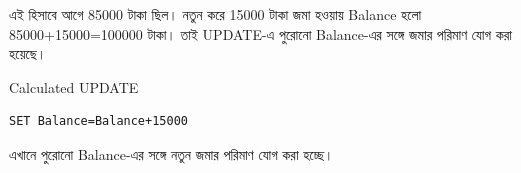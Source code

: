 এই হিসাবে আগে 85000 টাকা ছিল। নতুন করে 15000 টাকা জমা হওয়ায় Balance হলো 85000+15000=100000 টাকা। তাই UPDATE-এ পুরোনো Balance-এর সঙ্গে জমার পরিমাণ যোগ করা হয়েছে।

\begin{keypointbox}{Calculated UPDATE}

\par\noindent\begin{minipage}{\linewidth}
\begin{verbatim}
SET Balance=Balance+15000
\end{verbatim}
\end{minipage}\par

এখানে পুরোনো Balance-এর সঙ্গে নতুন জমার পরিমাণ যোগ করা হচ্ছে।

\end{keypointbox}

